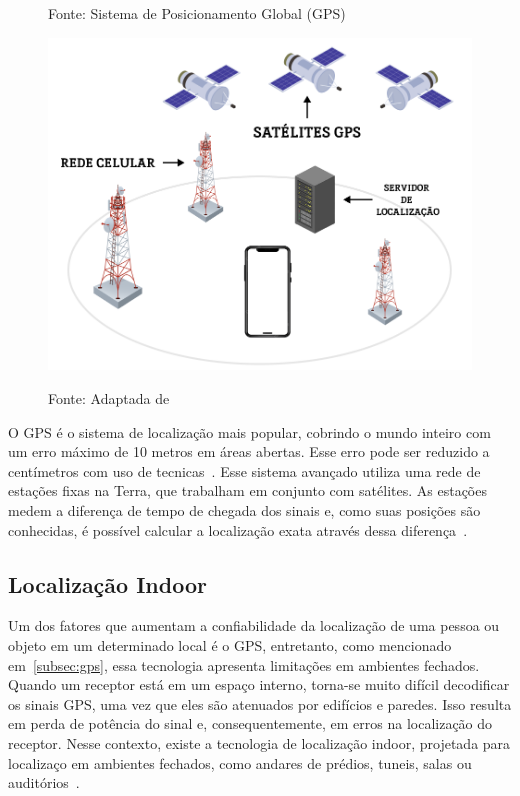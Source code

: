 \begin{figure}[H]
    \centering
    \caption{Fonte: Sistema de Posicionamento Global (GPS)}
    \begin{minipage}{.9\textwidth}
        \centering
        \includegraphics[width=.9\linewidth]{imagens/sistema-gps}
        \label{fig: Sistema de GPS}
    \end{minipage}
    \caption*{Fonte: Adaptada de~\cite{juansyah2015pembangunan}}
\end{figure}

O GPS é o sistema de localização mais popular, cobrindo o mundo inteiro com um erro máximo de 10 metros em áreas abertas.
Esse erro pode ser reduzido a centímetros com uso de tecnicas~\cite{moura2007wbls}.
Esse sistema avançado utiliza uma rede de estações fixas na Terra, que trabalham em conjunto com satélites.
As estações medem a diferença de tempo de chegada dos sinais e, como suas posições são conhecidas, é possível calcular a localização exata através dessa diferença~\cite{djuknic2001geolocation}.

\subsection{Localização Indoor}\label{subsec:localizacao-indoor}

Um dos fatores que aumentam a confiabilidade da localização de uma pessoa ou objeto em um determinado local é o GPS, entretanto, como mencionado em~\ref{subsec:gps}, essa tecnologia apresenta limitações em ambientes fechados.
Quando um receptor está em um espaço interno, torna-se muito difícil decodificar os sinais GPS, uma vez que eles são atenuados por edifícios e paredes.
Isso resulta em perda de potência do sinal e, consequentemente, em erros na localização do receptor.
Nesse contexto, existe a tecnologia de localização indoor, projetada para localizaço em ambientes fechados, como andares de prédios, tuneis, salas ou auditórios~\cite{mittelstadt2018bluepath}.

